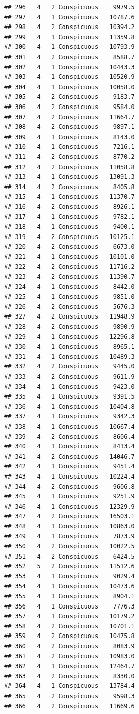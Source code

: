 \documentclass[12pt,]{krantz}
\theoremstyle{definition}
\theoremstyle{definition}
\theoremstyle{remark}
\begin{document}
\begin{verbatim}
## 296   4   2 Conspicuous    9979.5
## 297   4   1 Conspicuous   10787.6
## 298   4   2 Conspicuous   10394.2
## 299   4   1 Conspicuous   11359.8
## 300   4   1 Conspicuous   10793.9
## 301   4   2 Conspicuous    8588.7
## 302   4   1 Conspicuous   10443.3
## 303   4   1 Conspicuous   10520.9
## 304   4   1 Conspicuous   10058.0
## 305   4   2 Conspicuous    9183.7
## 306   4   2 Conspicuous    9584.0
## 307   4   2 Conspicuous   11664.7
## 308   4   2 Conspicuous    9897.1
## 309   4   1 Conspicuous    8143.0
## 310   4   1 Conspicuous    7216.1
## 311   4   2 Conspicuous    8770.2
## 312   4   2 Conspicuous   11058.8
## 313   4   1 Conspicuous   13091.3
## 314   4   2 Conspicuous    8405.8
## 315   4   1 Conspicuous   11370.7
## 316   4   2 Conspicuous    8926.1
## 317   4   1 Conspicuous    9782.1
## 318   4   1 Conspicuous    9400.1
## 319   4   2 Conspicuous   10125.1
## 320   4   2 Conspicuous    6673.0
## 321   4   1 Conspicuous   10101.0
## 322   4   2 Conspicuous   11716.2
## 323   4   2 Conspicuous   11390.7
## 324   4   1 Conspicuous    8442.0
## 325   4   1 Conspicuous    9851.0
## 326   4   2 Conspicuous    5676.3
## 327   4   2 Conspicuous   11948.9
## 328   4   2 Conspicuous    9890.9
## 329   4   1 Conspicuous   12296.8
## 330   4   1 Conspicuous    8965.1
## 331   4   1 Conspicuous   10489.3
## 332   4   2 Conspicuous    9445.0
## 333   4   2 Conspicuous    9611.9
## 334   4   1 Conspicuous    9423.0
## 335   4   1 Conspicuous    9391.5
## 336   4   1 Conspicuous   10404.8
## 337   4   1 Conspicuous    9342.3
## 338   4   1 Conspicuous   10667.4
## 339   4   2 Conspicuous    8606.4
## 340   4   1 Conspicuous    8413.4
## 341   4   2 Conspicuous   14046.7
## 342   4   1 Conspicuous    9451.4
## 343   4   1 Conspicuous   10224.4
## 344   4   2 Conspicuous    9606.8
## 345   4   1 Conspicuous    9251.9
## 346   4   1 Conspicuous   12329.9
## 347   4   2 Conspicuous   16503.1
## 348   4   1 Conspicuous   10863.0
## 349   4   1 Conspicuous    7873.9
## 350   4   2 Conspicuous   10022.5
## 351   4   2 Conspicuous    6424.5
## 352   5   2 Conspicuous   11512.6
## 353   4   1 Conspicuous    9029.4
## 354   4   1 Conspicuous   10473.6
## 355   4   1 Conspicuous    8904.1
## 356   4   1 Conspicuous    7776.3
## 357   4   1 Conspicuous   10179.2
## 358   4   2 Conspicuous   10701.1
## 359   4   2 Conspicuous   10475.8
## 360   4   2 Conspicuous    8083.9
## 361   4   2 Conspicuous   10983.0
## 362   4   1 Conspicuous   12464.7
## 363   4   2 Conspicuous    8330.0
## 364   4   1 Conspicuous   13784.4
## 365   4   2 Conspicuous    9598.3
## 366   4   2 Conspicuous   11669.6

\end{verbatim}
\end{document}
